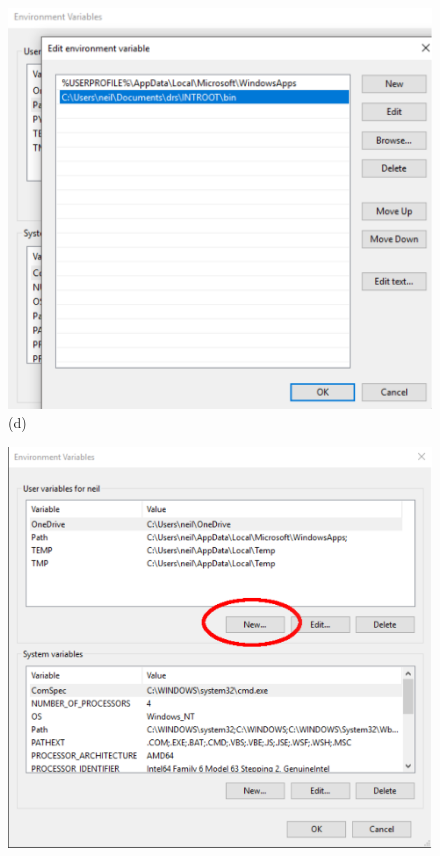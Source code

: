 \begin{figure}
\begin{center}
\begin{minipage}[t]{.29\textwidth}
\begin{center}
\includegraphics[width=\textwidth]{Figures/win/Win4.pdf}
(d)
\end{center}
\end{minipage}
\begin{minipage}[t]{.29\textwidth}
\begin{center}
\includegraphics[width=\textwidth]{Figures/win/Win5.pdf}

\end{center}
\end{minipage}
\end{center}
\end{figure}
